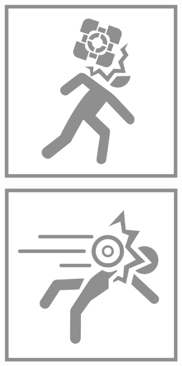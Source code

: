 \begin{figure}[H]
\begin{subfigure}[l]{0.195\linewidth}
    \includegraphics[width=\textwidth]{Sources/PortalIcons/d2.jpg}
  \end{subfigure}
  \begin{subfigure}[l]{0.195\linewidth}
    \includegraphics[width=\textwidth]{Sources/PortalIcons/d3.jpg}

\end{subfigure}
\end{figure}
